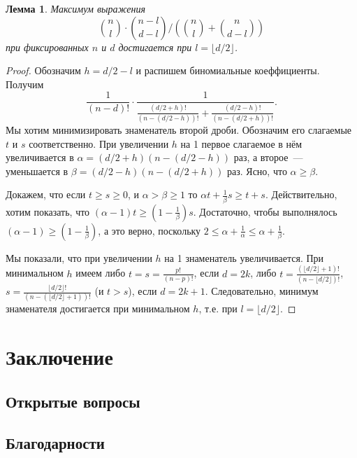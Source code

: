 \documentclass[12pt]{article}
\newtheorem{lemma}{Лемма}
\begin{document}
    \begin{lemma}
        \label{lm:middle}
        Максимум выражения
        $$
            \binom{n}{l}\cdot\binom{n-l}{d-l} / \left(\binom{n}{l} + \binom{n}{d-l}\right)
        $$
         при фиксированных $n$ и $d$ достигается при $l = \lfloor d/2 \rfloor$.
    \end{lemma}
    \begin{proof}
        Обозначим $h = d/2 - l$ и распишем биномиальные коеффициенты. Получим
        $$
            \frac{1}{(n-d)!}\cdot
            \frac{1}{\frac{(d/2+h)!}{(n-(d/2-h))!} + \frac{(d/2-h)!}{(n-(d/2+h))!}}.
        $$
        Мы хотим минимизировать знаменатель второй дроби. Обозначим его слагаемые $t$ и $s$ соответственно.
        При увеличении $h$ на 1 первое слагаемое в нём увеличивается в $\alpha = (d/2+h)(n-(d/2-h))$ раз,
        а второе~--- уменьшается в $\beta = (d/2-h)(n-(d/2+h))$ раз. Ясно, что $\alpha \ge \beta$.

        Докажем, что если $t\ge s\ge 0$, и $\alpha > \beta \ge 1$ то $\alpha t + \frac1\beta s\ge t+s$.
        Действительно, хотим показать, что $(\alpha - 1)t\ge(1-\frac1\beta)s$. Достаточно, чтобы выполнялось $(\alpha - 1)\ge(1-\frac1\beta)$,
        а это верно, поскольку $2 \le \alpha + \frac1\alpha \le \alpha + \frac1\beta$.

        Мы показали, что при увеличении $h$ на 1 знаменатель увеличивается.
        При минимальном $h$ имеем либо $t = s = \frac{p!}{(n-p)!}$, если $d = 2k$,
        либо $t = \frac{(\lfloor d/2 \rfloor + 1)!}{(n - \lfloor d/2 \rfloor)!}$,
        $s = \frac{\lfloor d/2 \rfloor!}{(n-(\lfloor d/2 \rfloor + 1))!}$ (и $t > s$),
        если $d = 2k + 1$.
        Следовательно, минимум знаменателя достигается при минимальном $h$, т.е. при $l = \lfloor d/2 \rfloor$.
    \end{proof}
    \section{Заключение}
    \subsection{Открытые вопросы}
    \subsection{Благодарности}
    
    
\end{document}
